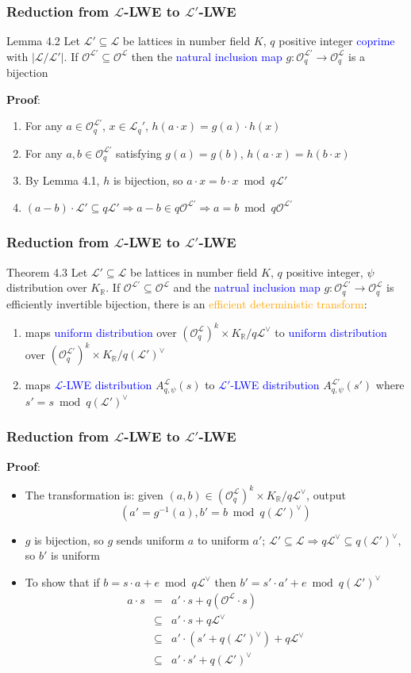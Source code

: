 \documentclass{beamer}
\newcommand{\blue}[1]{\textcolor{blue}{#1}}
\newcommand{\dgreen}[1]{\textcolor{dgreen}{#1}}
\newcommand{\orange}[1]{\textcolor{orange}{#1}}
\newcommand{\cL}{\mathcal{L}}
\newcommand{\cO}{\mathcal{O}}
\newcommand{\cOL}{\mathcal{O}^{\mathcal{L}}}
\newcommand{\cOLp}{\mathcal{O}^{\mathcal{L'}}}
\newcommand{\cLV}{\mathcal{L}^{\vee}}
\newcommand{\cLpV}{(\mathcal{L'})^{\vee}}
\newcommand{\KR}{K_{\mathbb{R}}}
\begin{document}
\frame
{
  \frametitle{Reduction from $\cL$-LWE to $\cL'$-LWE}

  \begin{block}{Lemma 4.2}
  Let $\cL'\subseteq\cL$ be lattices in number field $K$, $q$ positive integer \blue{coprime} with $|\cL/\cL'|$.
  If $\cOLp\subseteq\cO^{\cL}$ then the \blue{natural inclusion map} $g:\cOLp_q\to\cOL_q$ is a \dgreen{bijection}
  \end{block}
  \textbf{Proof}:
  \begin{enumerate}
  	\item For any $a\in\cOLp_q$, $x\in\cL_q'$, $h(a\cdot x)=g(a)\cdot h(x)$
  	\item For any $a,b\in\cOLp_q$ satisfying $g(a)=g(b)$, $h(a\cdot x)=h(b\cdot x)$
  	\item By Lemma 4.1, $h$ is bijection, so $a\cdot x=b\cdot x\bmod q\cL'$
  	\item $(a-b)\cdot\cL'\subseteq q\cL'\Rightarrow a-b\in q\cOLp\Rightarrow a=b\bmod q\cOLp$
  \end{enumerate}
}

\frame
{
  \frametitle{Reduction from $\cL$-LWE to $\cL'$-LWE}
  \begin{block}{Theorem 4.3}
  Let $\cL'\subseteq\cL$ be lattices in number field $K$, $q$ positive integer, $\psi$ distribution over $\KR$.
  If $\cOLp\subseteq\cOL$ and the \blue{natrual inclusion map} $g:\cOLp_q\to\cOL_q$ is \dgreen{efficiently invertible bijection}, there is an \orange{efficient deterministic transform}:
  \begin{enumerate}
  	\item maps \blue{uniform distribution} over $(\cOL_q)^k\times\KR/q\cLV$ to \blue{uniform distribution} over $(\cOLp_q)^k\times\KR/q\cLpV$
  	\item maps \blue{$\cL$-LWE distribution} $A_{q,\psi}^{\cL}(s)$ to \blue{$\cL'$-LWE distribution} $A_{q,\psi}^{\cL'}(s')$ where $s'=s\bmod q\cLpV$
  \end{enumerate}
  \end{block}
}

\frame
{
  \frametitle{Reduction from $\cL$-LWE to $\cL'$-LWE}
  \textbf{Proof}:
  \begin{itemize}
  	\item The transformation is: given $(a,b)\in(\cOL_q)^k\times\KR/q\cLV$, output
  	\[(a'=g^{-1}(a),b'=b\bmod q\cLpV)\]
  	\item $g$ is bijection, so $g$ sends uniform $a$ to uniform $a'$; $\cL'\subseteq\cL\Rightarrow q\cLV\subseteq q\cLpV$, so $b'$ is uniform
  	\item To show that if $b=s\cdot a+e\bmod q\cLV$ then $b'=s'\cdot a'+e\bmod q\cLpV$
  	\begin{eqnarray*}
  		a\cdot s &=& a'\cdot s + q(\cOL\cdot s) \\
  		&\subseteq& a'\cdot s + q\cLV \\
  		&\subseteq& a'\cdot(s'+q\cLpV) + q\cLV \\
  		&\subseteq& a'\cdot s'+q\cLpV
  	\end{eqnarray*}

  \end{itemize}
}
\end{document}
